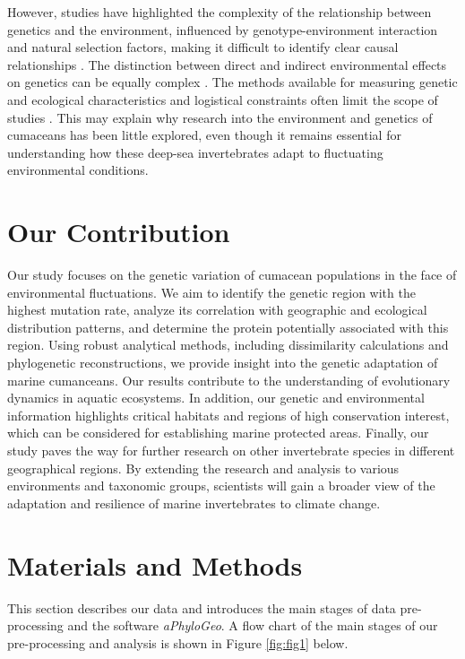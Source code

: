 However, studies have highlighted the complexity of the relationship between genetics and the environment, influenced by genotype-environment interaction and natural selection factors, making it difficult to identify clear causal relationships \citep{balkenhol_identifying_2009}. The distinction between direct and indirect environmental effects on genetics can be equally complex \citep{manel_perspectives_2010, balkenhol_landscape_2019}. The methods available for measuring genetic and ecological characteristics and logistical constraints often limit the scope of studies \citep{manel_perspectives_2010, shafer_widespread_2013}. This may explain why research into the environment and genetics of cumaceans has been little explored, even though it remains essential for understanding how these deep-sea invertebrates adapt to fluctuating environmental conditions.

\section{Our Contribution}

Our study focuses on the genetic variation of cumacean populations in the face of environmental fluctuations. We aim to identify the genetic region with the highest mutation rate, analyze its correlation with geographic and ecological distribution patterns, and determine the protein potentially associated with this region. Using robust analytical methods, including dissimilarity calculations and phylogenetic reconstructions, we provide insight into the genetic adaptation of marine cumanceans. Our results contribute to the understanding of evolutionary dynamics in aquatic ecosystems. In addition, our genetic and environmental information highlights critical habitats and regions of high conservation interest, which can be considered for establishing marine protected areas. Finally, our study paves the way for further research on other invertebrate species in different geographical regions. By extending the research and analysis to various environments and taxonomic groups, scientists will gain a broader view of the adaptation and resilience of marine invertebrates to climate change.

\section{Materials and Methods}\label{materials-methods}
This section describes our data and introduces the main stages of data pre-processing and the software \textit{aPhyloGeo}. A flow chart of the main stages of our pre-processing and analysis is shown in Figure \ref{fig:fig1} below.

